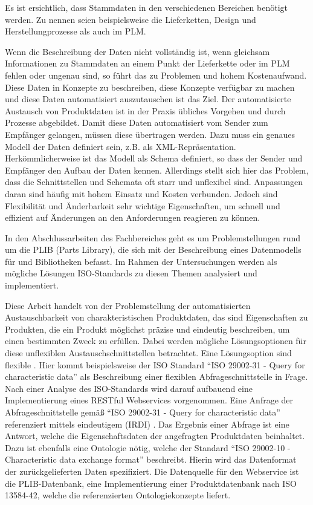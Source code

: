 Es ist ersichtlich, dass Stammdaten in den verschiedenen Bereichen benötigt werden. Zu nennen seien beispielsweise die Lieferketten, Design und Herstellungprozesse als auch im \gls{PLM}.     

Wenn die Beschreibung der Daten nicht vollständig ist, wenn gleichsam Informationen zu Stammdaten an einem Punkt der Lieferkette oder im \gls{PLM} fehlen oder ungenau sind, so führt das zu Problemen und hohem Kostenaufwand. 
Diese Daten in Konzepte zu beschreiben, diese Konzepte verfügbar zu machen und diese Daten automatisiert auszutauschen ist das Ziel. Der automatisierte Austausch von Produktdaten ist in der Praxis übliches Vorgehen und durch Prozesse abgebildet. Damit diese Daten automatisiert vom Sender zum Empfänger gelangen, müssen diese übertragen werden. Dazu muss ein genaues Modell der Daten definiert sein, z.B. als XML-Repräsentation. Herkömmlicherweise ist das Modell als Schema definiert, so dass der Sender und Empfänger den Aufbau der Daten kennen. Allerdings stellt sich hier das Problem, dass die Schnittstellen und Schemata oft starr und unflexibel sind. Anpassungen daran sind häufig mit hohem Einsatz und Kosten verbunden. Jedoch sind Flexibilität und Änderbarkeit sehr wichtige Eigenschaften, um schnell und effizient auf Änderungen an den Anforderungen reagieren zu können. 

In den Abschlussarbeiten des Fachbereiches geht es um Problemstellungen rund um die \gls{PLIB} (Parts Library), die sich mit der Beschreibung eines Datenmodells für  und Bibliotheken befasst. Im Rahmen der Untersuchungen werden als mögliche Lösungen ISO-Standards zu diesen Themen analysiert und implementiert. 

Diese Arbeit handelt von der Problemstellung der automatisierten Austauschbarkeit von charakteristischen Produktdaten, das sind Eigenschaften zu Produkten, die ein Produkt möglichst präzise und eindeutig beschreiben, um einen bestimmten Zweck zu erfüllen. Dabei werden mögliche Lösungsoptionen für diese unflexiblen Austauschschnittstellen betrachtet. Eine Lösungsoption sind flexible . Hier kommt beispielsweise der ISO Standard \enquote{ISO 29002-31 - Query for characteristic data} als Beschreibung einer flexiblen \gls{Abfrageschnittstelle} in Frage. Nach einer Analyse des ISO-Standards wird darauf aufbauend eine Implementierung eines \gls{REST}ful \glspl{Webservice} vorgenommen. 
Eine Anfrage der \gls{Abfrageschnittstelle} gemäß \enquote{ISO 29002-31 - Query for characteristic data} referenziert mittels eindeutigem  (IRDI) . Das Ergebnis einer Abfrage ist eine Antwort, welche die Eigenschaftsdaten der angefragten Produktdaten beinhaltet. Dazu ist ebenfalls eine Ontologie nötig, welche der Standard \enquote{ISO 29002-10 - Characteristic data exchange format} beschreibt. Hierin wird das Datenformat der zurückgelieferten Daten spezifiziert. Die Datenquelle für den Webservice ist die PLIB-Datenbank, eine Implementierung einer Produktdatenbank nach ISO 13584-42, welche die referenzierten Ontologiekonzepte liefert. 

